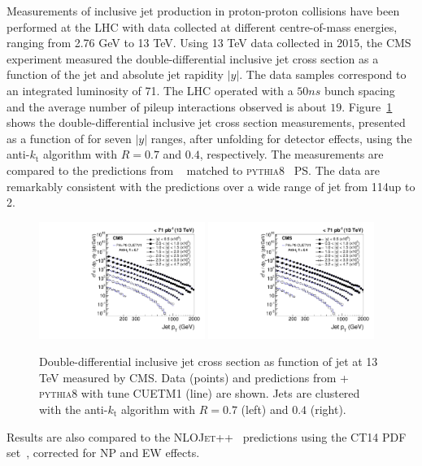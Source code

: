 \documentclass{PoS}
\providecommand{\NLOJETPP} {{\textsc{NLOJet++}}\xspace}
\providecommand{\kts}{\ensuremath{k_{\mathrm{t}}}\xspace}
\providecommand{\PYTHIAE} {{\textsc{pythia8}}\xspace}
\begin{document}
Measurements of inclusive jet production in proton-proton collisions have been performed at the LHC with data collected
at different centre-of-mass energies, ranging from 2.76 GeV to 13 TeV.  
Using 13 TeV data collected in 2015, the CMS experiment measured the double-differential inclusive jet
cross section as a function of the jet \pt and absolute jet rapidity $|y|$\cite{Khachatryan:2016wdh}. The data samples correspond to
an integrated luminosity of 71\pbinv. The LHC operated with a $50\unit{ns}$ bunch spacing and the
average number of pileup interactions observed is about $19$.   
Figure~\ref{fig:crossSection} shows the double-differential inclusive jet cross section measurements,
presented as a function of \pt for seven $|y|$ ranges, after
unfolding for detector effects, using the anti-\kts algorithm with $R =
0.7$ and $0.4$, respectively. The measurements are compared to the predictions from \POWHEG~\cite{Alioli:2010xa}
matched to \PYTHIAE~\cite{Sjostrand:2007gs} PS. The data are remarkably consistent with the predictions over a wide range of jet \pt from 114\GeV up to
2\TeV.
\begin{figure}[htbp] \centering
  \includegraphics[width=0.48\textwidth]{Figure1-a.pdf}
  \includegraphics[width=0.48\textwidth]{Figure1-b.pdf}
  \caption{Double-differential inclusive jet cross section as function of jet \pt at 13 TeV measured by CMS. Data (points) and
predictions from \POWHEG + \PYTHIAE with tune CUETM1 (line) are shown. Jets are clustered with the anti-\kts
algorithm with $R = 0.7$ (left) and $0.4$ (right).}
  \label{fig:crossSection}
\end{figure}
Results are also compared to the \NLOJETPP~\cite{Nagy:2003tz} predictions using the CT14 PDF set~\cite{Dulat:2015mca}, corrected for NP and EW effects.
\end{document}
